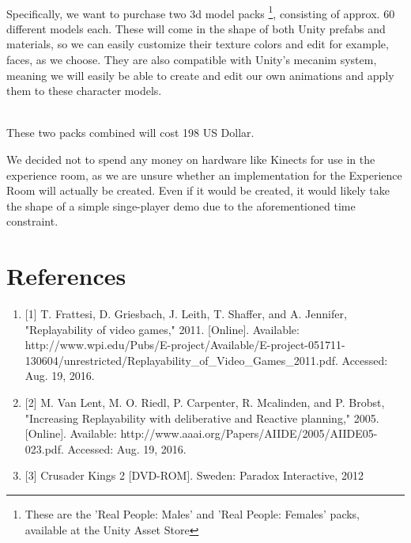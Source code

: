 \documentclass[11pt]{article}
\begin{document}
~\\
Specifically, we want to purchase two 3d model packs \footnote{These are the 'Real People: Males' and 'Real People: Females' packs, available at the Unity Asset Store}, consisting of approx. 60 different models each. These will come in the shape of both Unity prefabs and materials, so we can easily customize their texture colors and edit for example, faces, as we choose. They are also compatible with Unity's mecanim system, meaning we will easily be able to create and edit our own animations and apply them to these character models.

~\\
These two packs combined will cost 198 US Dollar.

We decided not to spend any money on hardware like Kinects for use in the experience room, as we are unsure whether an implementation for the Experience Room will actually be created. Even if it would be created, it would likely take the shape of a simple singe-player demo due to the aforementioned time constraint. 


\newpage
{}
{}
\section*{References}
\begin{enumerate}
\item{ [1] T. Frattesi, D. Griesbach, J. Leith, T. Shaffer, and A. Jennifer, "Replayability of video games," 2011. [Online]. Available: http://www.wpi.edu/Pubs/E-project/Available/E-project-051711-130604/unrestricted/Replayability\_of\_Video\_Games\_2011.pdf. Accessed: Aug. 19, 2016. 
}

\item{
[2]	M. Van Lent, M. O. Riedl, P. Carpenter, R. Mcalinden, and P. Brobst, "Increasing Replayability with deliberative and Reactive planning," 2005. [Online]. Available: http://www.aaai.org/Papers/AIIDE/2005/AIIDE05-023.pdf. Accessed: Aug. 19, 2016.	}

\item{
[3] Crusader Kings 2 [DVD-ROM]. Sweden: Paradox Interactive, 2012
}
\end{enumerate}
\end{document}
